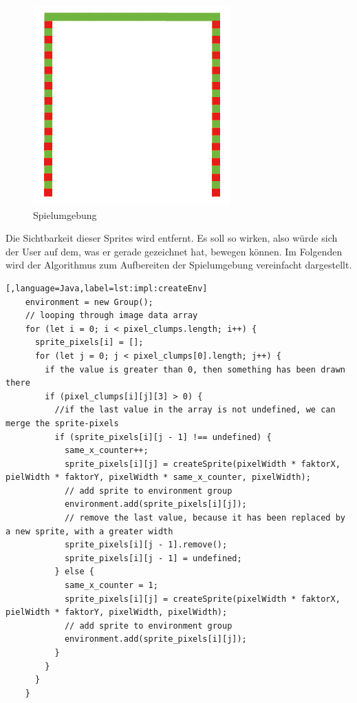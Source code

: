 \begin{figure}[H]
    \centering
    \includegraphics[scale=0.75]{pics/simpleDrawing3.PNG}
    \caption{Spielumgebung}
\end{figure}

Die Sichtbarkeit dieser Sprites wird entfernt. Es soll so wirken, also würde sich der User auf dem, was er gerade gezeichnet hat, bewegen können.
Im Folgenden wird der Algorithmus zum Aufbereiten der Spielumgebung vereinfacht dargestellt.
\begin{lstlisting}[,language=Java,label=lst:impl:createEnv]
    environment = new Group();
    // looping through image data array
    for (let i = 0; i < pixel_clumps.length; i++) {
      sprite_pixels[i] = [];
      for (let j = 0; j < pixel_clumps[0].length; j++) {
        if the value is greater than 0, then something has been drawn there
        if (pixel_clumps[i][j][3] > 0) {
          //if the last value in the array is not undefined, we can merge the sprite-pixels
          if (sprite_pixels[i][j - 1] !== undefined) {
            same_x_counter++;
            sprite_pixels[i][j] = createSprite(pixelWidth * faktorX, pielWidth * faktorY, pixelWidth * same_x_counter, pixelWidth);
            // add sprite to environment group
            environment.add(sprite_pixels[i][j]);
            // remove the last value, because it has been replaced by a new sprite, with a greater width
            sprite_pixels[i][j - 1].remove();
            sprite_pixels[i][j - 1] = undefined;
          } else {
            same_x_counter = 1;
            sprite_pixels[i][j] = createSprite(pixelWidth * faktorX, pielWidth * faktorY, pixelWidth, pixelWidth); 
            // add sprite to environment group
            environment.add(sprite_pixels[i][j]);
          }
        }
      }
    }
\end{lstlisting}

